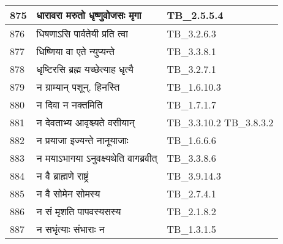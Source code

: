 \documentclass[17pt]{extarticle}
\begin{document}
\begin{longtable}{||p{0.4in}||p{4.9in}||p{0.9in}||}
    \hline
        
    875 & धारावरा मरुतो धृष्णुवोजसः मृगा & TB\_2.5.5.4       \\
    
    \hline
        
    876 & धिषणाऽसि पार्वतेयी प्रति त्वा & TB\_3.2.6.3       \\
    
    \hline
        
    877 & धिष्णिया वा एते न्युप्यन्ते & TB\_3.3.8.1       \\
    
    \hline
        
    878 & धृष्टिरसि ब्रह्म यच्छेत्याह धृत्यै & TB\_3.2.7.1       \\
    
    \hline
        
    879 & न ग्राम्यान् पशून्. हिनस्ति & TB\_1.6.10.3       \\
    
    \hline
        
    880 & न दिवा न नक्तमिति & TB\_1.7.1.7       \\
    
    \hline
        
    881 & न देवताभ्य आवृश्च्यते वसीयान् & TB\_3.3.10.2 TB\_3.8.3.2       \\
    
    \hline
        
    882 & न प्रयाजा इज्यन्ते नानूयाजाः & TB\_1.6.6.6       \\
    
    \hline
        
    883 & न मयाऽभागया ऽनुवक्ष्यथेति वागब्रवीत् & TB\_3.3.8.6       \\
    
    \hline
        
    884 & न वै ब्राह्मणे राष्ट्रं & TB\_3.9.14.3       \\
    
    \hline
        
    885 & न वै सोमेन सोमस्य & TB\_2.7.4.1       \\
    
    \hline
        
    886 & न सं मृशति पापवस्यसस्य & TB\_2.1.8.2       \\
    
    \hline
        
    887 & न सभृंत्याः संभाराः न & TB\_1.3.1.5       \\
    

\end{longtable}
\end{document}
